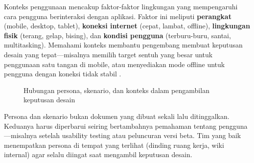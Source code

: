 Konteks penggunaan mencakup faktor-faktor lingkungan yang mempengaruhi cara pengguna berinteraksi dengan aplikasi. Faktor ini meliputi \textbf{perangkat} (mobile, desktop, tablet), \textbf{koneksi internet} (cepat, lambat, offline), \textbf{lingkungan fisik} (terang, gelap, bising), dan \textbf{kondisi pengguna} (terburu-buru, santai, multitasking). Memahami konteks membantu pengembang membuat keputusan desain yang tepat---misalnya memilih target sentuh yang besar untuk penggunaan satu tangan di mobile, atau menyediakan mode offline untuk pengguna dengan koneksi tidak stabil \cite{webdevLearn}.

\begin{figure}[H]
\centering
{}
\caption{Hubungan persona, skenario, dan konteks dalam pengambilan keputusan desain}
\end{figure}

\begin{catatan}
Persona dan skenario bukan dokumen yang dibuat sekali lalu ditinggalkan. Keduanya harus diperbarui seiring bertambahnya pemahaman tentang pengguna---misalnya setelah usability testing atau peluncuran versi beta. Tim yang baik menempatkan persona di tempat yang terlihat (dinding ruang kerja, wiki internal) agar selalu diingat saat mengambil keputusan desain.
\end{catatan}
